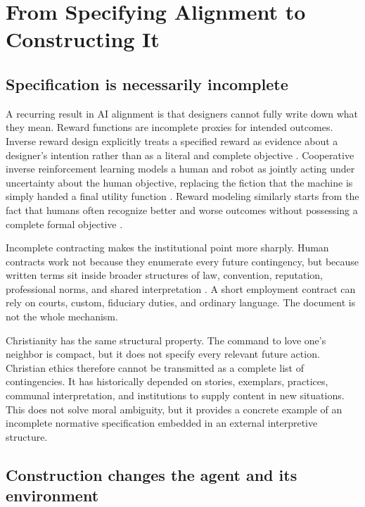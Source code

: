 \documentclass[11pt]{article}
\begin{document}
\section{From Specifying Alignment to Constructing It}

\subsection{Specification is necessarily incomplete}

A recurring result in AI alignment is that designers cannot fully write down what they mean. Reward functions are incomplete proxies for intended outcomes. Inverse reward design explicitly treats a specified reward as evidence about a designer's intention rather than as a literal and complete objective \parencite{hadfieldmenell2017ird}. Cooperative inverse reinforcement learning models a human and robot as jointly acting under uncertainty about the human objective, replacing the fiction that the machine is simply handed a final utility function \parencite{hadfieldmenell2016cirl}. Reward modeling similarly starts from the fact that humans often recognize better and worse outcomes without possessing a complete formal objective \parencite{leike2018reward}.

Incomplete contracting makes the institutional point more sharply. Human contracts work not because they enumerate every future contingency, but because written terms sit inside broader structures of law, convention, reputation, professional norms, and shared interpretation \parencite{hadfieldmenell2019incomplete}. A short employment contract can rely on courts, custom, fiduciary duties, and ordinary language. The document is not the whole mechanism.

Christianity has the same structural property. The command to love one's neighbor is compact, but it does not specify every relevant future action. Christian ethics therefore cannot be transmitted as a complete list of contingencies. It has historically depended on stories, exemplars, practices, communal interpretation, and institutions to supply content in new situations. This does not solve moral ambiguity, but it provides a concrete example of an incomplete normative specification embedded in an external interpretive structure.

\subsection{Construction changes the agent and its environment}
\end{document}
